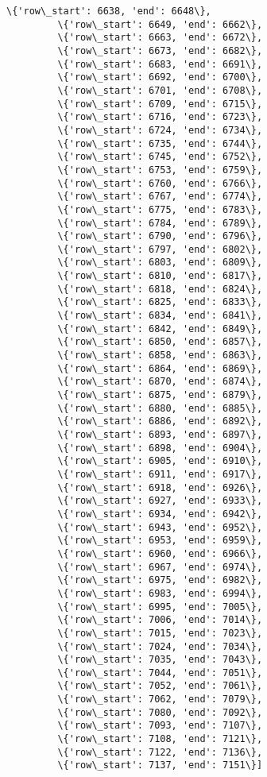 \documentclass[11pt]{article}
\begin{document}
\begin{Verbatim}[commandchars=\\\{\}]
         \{'row\_start': 6638, 'end': 6648\},
         \{'row\_start': 6649, 'end': 6662\},
         \{'row\_start': 6663, 'end': 6672\},
         \{'row\_start': 6673, 'end': 6682\},
         \{'row\_start': 6683, 'end': 6691\},
         \{'row\_start': 6692, 'end': 6700\},
         \{'row\_start': 6701, 'end': 6708\},
         \{'row\_start': 6709, 'end': 6715\},
         \{'row\_start': 6716, 'end': 6723\},
         \{'row\_start': 6724, 'end': 6734\},
         \{'row\_start': 6735, 'end': 6744\},
         \{'row\_start': 6745, 'end': 6752\},
         \{'row\_start': 6753, 'end': 6759\},
         \{'row\_start': 6760, 'end': 6766\},
         \{'row\_start': 6767, 'end': 6774\},
         \{'row\_start': 6775, 'end': 6783\},
         \{'row\_start': 6784, 'end': 6789\},
         \{'row\_start': 6790, 'end': 6796\},
         \{'row\_start': 6797, 'end': 6802\},
         \{'row\_start': 6803, 'end': 6809\},
         \{'row\_start': 6810, 'end': 6817\},
         \{'row\_start': 6818, 'end': 6824\},
         \{'row\_start': 6825, 'end': 6833\},
         \{'row\_start': 6834, 'end': 6841\},
         \{'row\_start': 6842, 'end': 6849\},
         \{'row\_start': 6850, 'end': 6857\},
         \{'row\_start': 6858, 'end': 6863\},
         \{'row\_start': 6864, 'end': 6869\},
         \{'row\_start': 6870, 'end': 6874\},
         \{'row\_start': 6875, 'end': 6879\},
         \{'row\_start': 6880, 'end': 6885\},
         \{'row\_start': 6886, 'end': 6892\},
         \{'row\_start': 6893, 'end': 6897\},
         \{'row\_start': 6898, 'end': 6904\},
         \{'row\_start': 6905, 'end': 6910\},
         \{'row\_start': 6911, 'end': 6917\},
         \{'row\_start': 6918, 'end': 6926\},
         \{'row\_start': 6927, 'end': 6933\},
         \{'row\_start': 6934, 'end': 6942\},
         \{'row\_start': 6943, 'end': 6952\},
         \{'row\_start': 6953, 'end': 6959\},
         \{'row\_start': 6960, 'end': 6966\},
         \{'row\_start': 6967, 'end': 6974\},
         \{'row\_start': 6975, 'end': 6982\},
         \{'row\_start': 6983, 'end': 6994\},
         \{'row\_start': 6995, 'end': 7005\},
         \{'row\_start': 7006, 'end': 7014\},
         \{'row\_start': 7015, 'end': 7023\},
         \{'row\_start': 7024, 'end': 7034\},
         \{'row\_start': 7035, 'end': 7043\},
         \{'row\_start': 7044, 'end': 7051\},
         \{'row\_start': 7052, 'end': 7061\},
         \{'row\_start': 7062, 'end': 7079\},
         \{'row\_start': 7080, 'end': 7092\},
         \{'row\_start': 7093, 'end': 7107\},
         \{'row\_start': 7108, 'end': 7121\},
         \{'row\_start': 7122, 'end': 7136\},
         \{'row\_start': 7137, 'end': 7151\}]
\end{Verbatim}
            

    
    
    
    
\end{document}
